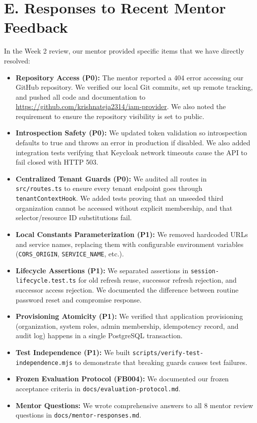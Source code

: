 \documentclass{article}
\begin{document}
\section*{E. Responses to Recent Mentor Feedback}
In the Week 2 review, our mentor provided specific items that we have directly resolved:
\begin{itemize}
    \item \textbf{Repository Access (P0):} The mentor reported a 404 error accessing our GitHub repository. We verified our local Git commits, set up remote tracking, and pushed all code and documentation to \url{https://github.com/krishnateja2314/iam-provider}. We also noted the requirement to ensure the repository visibility is set to public.
    \item \textbf{Introspection Safety (P0):} We updated token validation so introspection defaults to true and throws an error in production if disabled. We also added integration tests verifying that Keycloak network timeouts cause the API to fail closed with HTTP 503.
    \item \textbf{Centralized Tenant Guards (P0):} We audited all routes in \texttt{src/routes.ts} to ensure every tenant endpoint goes through \texttt{tenantContextHook}. We added tests proving that an unseeded third organization cannot be accessed without explicit membership, and that selector/resource ID substitutions fail.
    \item \textbf{Local Constants Parameterization (P1):} We removed hardcoded URLs and service names, replacing them with configurable environment variables (\texttt{CORS\_ORIGIN}, \texttt{SERVICE\_NAME}, etc.).
    \item \textbf{Lifecycle Assertions (P1):} We separated assertions in \texttt{session-lifecycle.test.ts} for old refresh reuse, successor refresh rejection, and successor access rejection. We documented the difference between routine password reset and compromise response.
    \item \textbf{Provisioning Atomicity (P1):} We verified that application provisioning (organization, system roles, admin membership, idempotency record, and audit log) happens in a single PostgreSQL transaction.
    \item \textbf{Test Independence (P1):} We built \texttt{scripts/verify-test-independence.mjs} to demonstrate that breaking guards causes test failures.
    \item \textbf{Frozen Evaluation Protocol (FB004):} We documented our frozen acceptance criteria in \texttt{docs/evaluation-protocol.md}.
    \item \textbf{Mentor Questions:} We wrote comprehensive answers to all 8 mentor review questions in \texttt{docs/mentor-responses.md}.
\end{itemize}
\end{document}
